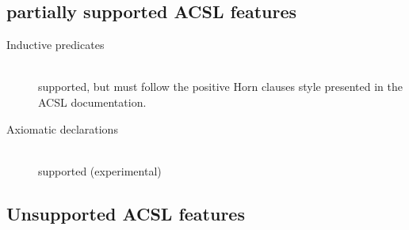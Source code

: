 \documentclass[a4paper,11pt,twoside,openright]{report}
\begin{document}
\subsection{partially supported ACSL features}

\begin{description}
\item[Inductive predicates] ~\\
  supported, but must follow the positive
  Horn clauses style presented in the ACSL documentation.
\item[Axiomatic declarations] ~\\
  supported (experimental)
\end{description}

\subsection{Unsupported ACSL features}
\end{document}
